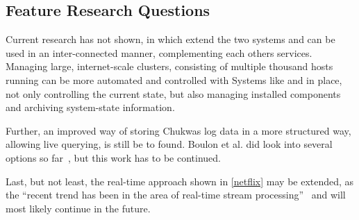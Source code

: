 \subsection{Feature Research Questions}
Current research has not shown, in which extend the two systems \amblong and \chuk can be used in an inter-connected manner, complementing each others services. Managing large, internet-scale clusters, consisting of multiple thousand hosts running \hadooplong can be more automated and controlled with Systems like \amb and \chuk in place, not only controlling the current state, but also managing installed components and archiving system-state information.

Further, an improved way of storing Chukwas log data in a more structured way, allowing live querying, is still be to found. Boulon et al. did look into several options so far~\cite{Boulonb}, but this work has to be continued.

Last, but not least, the real-time approach shown in \ref{netflix} may be extended, as the ``recent trend has been in the area of real-time stream processing''~\cite{Bae2013} and will most likely continue in the future.
